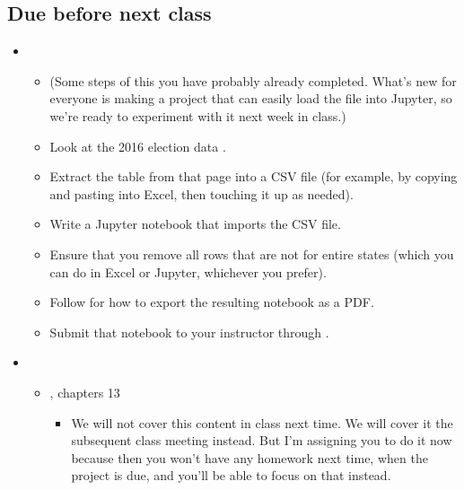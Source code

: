 \documentclass[letterpaper,10pt,english]{jupyterBook}
\begin{document}
\subsection{Due before next class}
\label{\detokenize{course-schedule:id8}}\begin{itemize}
\item {} 
\sphinxAtStartPar
{}
\begin{itemize}
\item {} 
\sphinxAtStartPar
(Some steps of this you have probably already completed.  What’s new for everyone is making a project that can easily load the file into Jupyter, so we’re ready to experiment with it next week in class.)

\item {} 
\sphinxAtStartPar
Look at the 2016 election data .

\item {} 
\sphinxAtStartPar
Extract the table from that page into a CSV file (for example, by copying and pasting into Excel, then touching it up as needed).

\item {} 
\sphinxAtStartPar
Write a Jupyter notebook that imports the CSV file.

\item {} 
\sphinxAtStartPar
Ensure that you remove all rows that are not for entire states (which you can do in Excel or Jupyter, whichever you prefer).

\item {} 
\sphinxAtStartPar
Follow  for how to export the resulting notebook as a PDF.

\item {} 
\sphinxAtStartPar
Submit that notebook to your instructor through .

\end{itemize}

\item {} 
\sphinxAtStartPar
{}
\begin{itemize}
\item {} 
\sphinxAtStartPar
{}, chapters 1\sphinxhyphen{}3
\begin{itemize}
\item {} 
\sphinxAtStartPar
{} We will not cover this content in class next time.  We will cover it the subsequent class meeting instead.  But I’m assigning you to do it now because then you won’t have any homework next time, when the project is due, and you’ll be able to focus on that instead.


\end{itemize}
\end{itemize}
\end{itemize}
\end{document}
